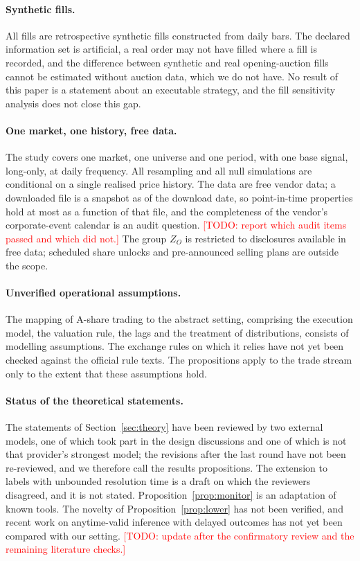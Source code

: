 \documentclass[11pt]{article}
\theoremstyle{remark}
\newcommand{\todo}[1]{\textcolor{red}{[TODO: #1]}}
\newcommand{\ZO}{Z_O}
\begin{document}
\paragraph{Synthetic fills.}
All fills are retrospective synthetic fills constructed from daily bars. The declared
information set is artificial, a real order may not have filled where a fill is recorded, and
the difference between synthetic and real opening-auction fills cannot be estimated without
auction data, which we do not have. No result of this paper is a statement about an executable
strategy, and the fill sensitivity analysis does not close this gap.

\paragraph{One market, one history, free data.}
The study covers one market, one universe and one period, with one base signal, long-only, at
daily frequency. All resampling and all null simulations are conditional on a single realised
price history. The data are free vendor data; a downloaded file is a snapshot as of the download
date, so point-in-time properties hold at most as a function of that file, and the completeness
of the vendor's corporate-event calendar is an audit question.
\todo{report which audit items passed and which did not.}
The group $\ZO$ is restricted to disclosures available in free data; scheduled share unlocks and
pre-announced selling plans are outside the scope.

\paragraph{Unverified operational assumptions.}
The mapping of A-share trading to the abstract setting, comprising the execution model, the
valuation rule, the lags and the treatment of distributions, consists of modelling assumptions.
The exchange rules on which it relies have not yet been checked against the official rule texts.
The propositions apply to the trade stream only to the extent that these assumptions hold.

\paragraph{Status of the theoretical statements.}
The statements of Section~\ref{sec:theory} have been reviewed by two external models, one of
which took part in the design discussions and one of which is not that provider's strongest
model; the revisions after the last round have not been re-reviewed, and we therefore call the
results propositions. The extension to labels with unbounded resolution time is a draft on which
the reviewers disagreed, and it is not stated. Proposition~\ref{prop:monitor} is an adaptation
of known tools. The novelty of Proposition~\ref{prop:lower} has not been verified, and recent
work on anytime-valid inference with delayed outcomes has not yet been compared with our
setting.
\todo{update after the confirmatory review and the remaining literature checks.}
\end{document}
